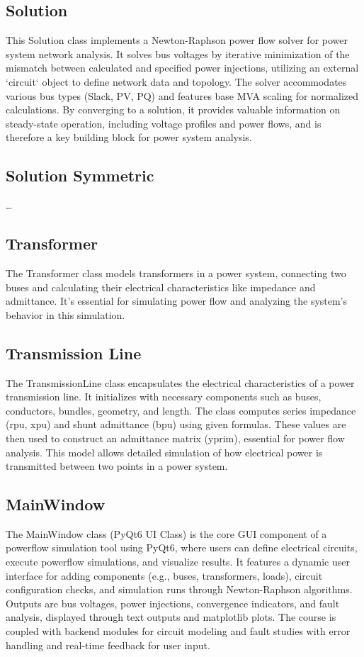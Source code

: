\documentclass{article}
\begin{document}
	\subsection{Solution}
	This Solution class implements a Newton-Raphson power flow solver for power system network analysis. It solves bus voltages by iterative minimization of the mismatch between calculated and specified power injections, utilizing an external `circuit` object to define network data and topology. The solver accommodates various bus types (Slack, PV, PQ) and features base MVA scaling for normalized calculations. By converging to a solution, it provides valuable information on steady-state operation, including voltage profiles and power flows, and is therefore a key building block for power system analysis.
	
	\subsection{Solution Symmetric}
	\dots	
	
	\subsection{Transformer}
	The Transformer class models transformers in a power system, connecting two buses and calculating their electrical characteristics like impedance and admittance. It's essential for simulating power flow and analyzing the system's behavior in this simulation.
	
	\subsection{Transmission Line}
	The TransmissionLine class encapsulates the electrical characteristics of a power transmission line. It initializes with necessary components such as buses, conductors, bundles, geometry, and length. The class computes series impedance (rpu, xpu) and shunt admittance (bpu) using given formulas. These values are then used to construct an admittance matrix (yprim), essential for power flow analysis. This model allows detailed simulation of how electrical power is transmitted between two points in a power system.
	
	\subsection{MainWindow}
	The MainWindow class (PyQt6 UI Class) is the core GUI component of a powerflow simulation tool using PyQt6, where users can define electrical circuits, execute powerflow simulations, and visualize results. It features a dynamic user interface for adding components (e.g., buses, transformers, loads), circuit configuration checks, and simulation runs through Newton-Raphson algorithms. Outputs are bus voltages, power injections, convergence indicators, and fault analysis, displayed through text outputs and matplotlib plots. The course is coupled with backend modules for circuit modeling and fault studies with error handling and real-time feedback for user input.
	
\end{document}
